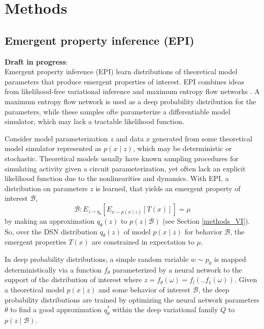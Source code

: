 \documentclass[11pt]{article}
\begin{document}



\appendix

\section{Methods}

\subsection{Emergent property inference (EPI)}\label{methods_EPI}
\textbf{Draft in progress}: \\
Emergent property inference (EPI) learn distributions of theoretical model parameters that produce emergent properties of interest.  EPI combines ideas from likelihood-free variational inference \cite{tran2017hierarchical} and maximum entropy flow networks \cite{loaiza2017maximum}.  A maximum entropy flow network is used as a deep probability distribution for the parameters, while these samples ofte parameterize a differentiable model simulator, which may lack a tractable likelihood function.

Consider model parameterization $z$ and data $x$ generated from some theoretical model simulator represented as $p(x \mid z)$, which may be deterministic or stochastic.  Theoretical models usually have known sampling procedures for simulating activity given a circuit parameterization, yet often lack an explicit likelihood function due to the nonlinearities and dynamics. With EPI, a distribution on parameters $z$ is learned, that yields an emergent property of interest $\mathcal{B}$,
\begin{equation}
\mathcal{B}: E_{z \sim q_\theta}\left[ E_{x\sim p(x \mid z)}\left[T(x)\right] \right] = \mu
\end{equation}
by making an approximation $q_\theta(z)$ to $p(z \mid \mathcal{B})$ (see Section \ref{methods_VI}).  So, over the DSN distribution $q_\theta(z)$ of model $p(x \mid z)$ for behavior $\mathcal{B}$, the emergent properties $T(x)$ are constrained in expectation to $\mu$.

 In deep probability distributions, a simple random variable $w \sim p_0$ is mapped deterministically via a function $f_\theta$ parameterized by a neural network to the support of the distribution of interest where $z = f_{\theta}(\omega) = f_l(..f_1(\omega))$.  Given a theoretical model $p(x \mid z)$ and some behavior of interest $\mathcal{B}$, the deep probability distributions are trained by optimizing the neural network parameters $\theta$ to find a good approximation $q_{\theta}^*$ within the deep variational family $Q$ to $p(z \mid \mathcal{B})$.
\end{document}
